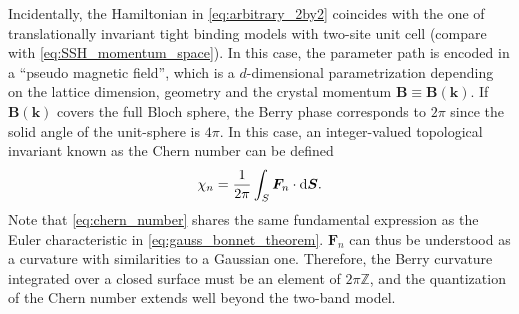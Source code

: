 Incidentally, the Hamiltonian in \cref{eq:arbitrary_2by2} coincides with the one of translationally invariant tight binding models with two-site unit cell (compare with \cref{eq:SSH_momentum_space}).
In this case, the parameter path is encoded in a ``pseudo magnetic field'', which is a $d$-dimensional parametrization depending on the lattice dimension, geometry and the crystal momentum $\bm B\equiv\bm B(\bm k)$.
If $\bm B(\bm k)$ covers the full Bloch sphere, the Berry phase corresponds to $2\pi$ since the solid angle of the unit-sphere is $4\pi$.
In this case, an integer-valued topological invariant known as the Chern number can be defined~\cite{Nakahara1990}
\begin{align}
    \chi_n = \frac1{2\pi}\int_S {\bm F_n}\cdot\mathrm d{\bm S}.
    \label{eq:chern_number}
\end{align}
Note that \cref{eq:chern_number} shares the same fundamental expression as the Euler characteristic in \cref{eq:gauss_bonnet_theorem}.
$\bm F_n$ can thus be understood as a curvature with similarities to a Gaussian one.
Therefore, the Berry curvature integrated over a closed surface must be an element of $2\pi \mathds Z$, and the quantization of the Chern number extends well beyond the two-band model.

%
%
